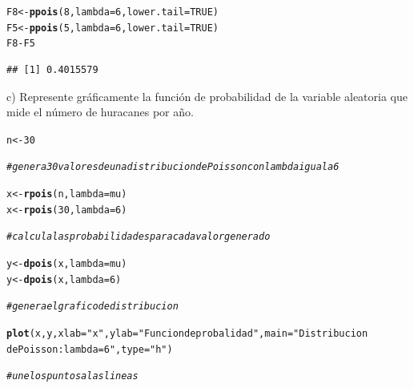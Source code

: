 \documentclass[12pt,letterpaper]{article}\usepackage[]{graphicx}\usepackage[]{color}
\makeatletter
\newcommand{\hlnum}[1]{\textcolor[rgb]{0.686,0.059,0.569}{#1}}%
\newcommand{\hlstr}[1]{\textcolor[rgb]{0.192,0.494,0.8}{#1}}%
\newcommand{\hlcom}[1]{\textcolor[rgb]{0.678,0.584,0.686}{\textit{#1}}}%
\newcommand{\hlopt}[1]{\textcolor[rgb]{0,0,0}{#1}}%
\newcommand{\hlstd}[1]{\textcolor[rgb]{0.345,0.345,0.345}{#1}}%
\newcommand{\hlkwb}[1]{\textcolor[rgb]{0.69,0.353,0.396}{#1}}%
\newcommand{\hlkwc}[1]{\textcolor[rgb]{0.333,0.667,0.333}{#1}}%
\newcommand{\hlkwd}[1]{\textcolor[rgb]{0.737,0.353,0.396}{\textbf{#1}}}%
\newenvironment{kframe}{%
 \def\at@end@of@kframe{}%
 \ifinner\ifhmode%
  \def\at@end@of@kframe{\end{minipage}}%
  \begin{minipage}{\columnwidth}%
 \fi\fi%
 \def\FrameCommand##1{\hskip\@totalleftmargin \hskip-\fboxsep
 \colorbox{shadecolor}{##1}\hskip-\fboxsep
     \hskip-\linewidth \hskip-\@totalleftmargin \hskip\columnwidth}%
 \MakeFramed {\advance\hsize-\width
   \@totalleftmargin\z@ \linewidth\hsize
   \@setminipage}}%
 {\par\unskip\endMakeFramed%
 \at@end@of@kframe}
\newenvironment{knitrout}{}{} %
\makeatother
\begin{document}
\begin{itemize}
\begin{knitrout}
\begin{kframe}
\begin{alltt}
\hlstd{F8} \hlkwb{<-} \hlkwd{ppois}\hlstd{(}\hlnum{8}\hlstd{,} \hlkwc{lambda} \hlstd{=} \hlnum{6}\hlstd{,} \hlkwc{lower.tail}\hlstd{=}\hlnum{TRUE}\hlstd{)}
\hlstd{F5} \hlkwb{<-} \hlkwd{ppois}\hlstd{(}\hlnum{5}\hlstd{,}\hlkwc{lambda} \hlstd{=} \hlnum{6}\hlstd{,} \hlkwc{lower.tail}\hlstd{=}\hlnum{TRUE}\hlstd{)}
\hlstd{F8} \hlopt{-} \hlstd{F5}
\end{alltt}
\begin{verbatim}
## [1] 0.4015579
\end{verbatim}
\end{kframe}
\end{knitrout}
\begin{description}
  \item c) Represente gráficamente la funci\'on de probabilidad de la variable aleatoria que mide el n\'umero de huracanes por año.
\end{description}
\begin{knitrout}
\color{fgcolor}\begin{kframe}
\begin{alltt}
\hlstd{n} \hlkwb{<-} \hlnum{30}

\hlcom{# genera 30 valores de una distribucion de Poisson con lambda igual a 6 }

\hlstd{x} \hlkwb{<-} \hlkwd{rpois}\hlstd{(n,} \hlkwc{lambda}\hlstd{=mu)}
\hlstd{x} \hlkwb{<-} \hlkwd{rpois}\hlstd{(}\hlnum{30}\hlstd{,} \hlkwc{lambda}\hlstd{=}\hlnum{6}\hlstd{)}

\hlcom{#calcula las probabilidades para cada valor generado }

\hlstd{y} \hlkwb{<-} \hlkwd{dpois}\hlstd{(x,} \hlkwc{lambda}\hlstd{=mu)}
\hlstd{y} \hlkwb{<-} \hlkwd{dpois}\hlstd{(x,} \hlkwc{lambda}\hlstd{=}\hlnum{6}\hlstd{)}


\hlcom{#genera el grafico de distribucion}

\hlkwd{plot}\hlstd{(x, y,} \hlkwc{xlab}\hlstd{=}\hlstr{"x"}\hlstd{,} \hlkwc{ylab}\hlstd{=}\hlstr{"Funcion de probalidad"}\hlstd{,} \hlkwc{main}\hlstd{=}\hlstr{"Distribucion 
     de Poisson: lambda = 6"}\hlstd{,} \hlkwc{type}\hlstd{=}\hlstr{"h"}\hlstd{)}

\hlcom{#une los puntos a las lineas}


\end{alltt}
\end{kframe}
\end{knitrout}
\end{itemize}
\end{document}

